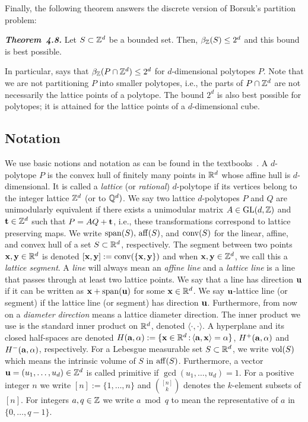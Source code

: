 Finally, the following theorem answers the discrete version of Borsuk's partition problem:

\begin{manualthm}\textbf{\emph{Theorem~4.8.}}
    Let $S \subset \mathbb{Z}^d$ be a bounded set. Then, $\beta_{\mathbb{Z}}(S) \leq 2^d$ and this bound is best possible.
\end{manualthm}

In particular,  says that $\beta_{\mathbb{Z}}(P \cap \mathbb{Z}^d) \leq 2^d$ for $d$-dimensional polytopes $P$. Note that we are not partitioning $P$ into smaller polytopes, i.e., the parts of $P \cap \mathbb{Z}^d$ are not necessarily the lattice points of a polytope. The bound $2^d$ is also best possible for polytopes; it is attained for the lattice points of a $d$-dimensional cube.

\subsection*{Notation}
We use basic notions and notation as can be found in the textbooks~\cite{grub07,zieglerbook}.
A $d$-polytope $P$ is the convex hull of finitely many points in $\mathbb{R}^d$ whose affine hull is $d$-dimensional. It is called a \emph{lattice} (or \emph{rational}) $d$-polytope if its vertices belong to the integer lattice $\mathbb{Z}^d$ (or to $\mathbb{Q}^d)$. We say two lattice $d$-polytopes $P$ and $Q$ are unimodularly equivalent if there exists a unimodular matrix $A \in \operatorname{GL}(d,\mathbb{Z})$ and $\mathbf{t} \in \mathbb{Z}^d$ such that $P=AQ+\mathbf{t}$, i.e., these transformations correspond to lattice preserving maps. We write $\operatorname{span}(S), \, \operatorname{aff}(S)$, and $\operatorname{conv}(S)$ for the linear, affine, and convex hull of a set $S \subset \mathbb{R}^d$, respectively.
The segment between two points $\mathbf{x},\mathbf{y} \in \mathbb{R}^d$ is denoted $[\mathbf{x},\mathbf{y}]:=\operatorname{conv}(\{\mathbf{x},\mathbf{y}\})$ and when $\mathbf{x},\mathbf{y} \in \mathbb{Z}^d$, we call this a \textit{lattice segment}. A \emph{line} will always mean an \emph{affine line} and a \emph{lattice line} is a line that passes through at least two lattice points. We say that a line has direction $\mathbf{u}$ if it can be written as $\mathbf{x}+\operatorname{span}(\mathbf{u})$ for some $\mathbf{x} \in \mathbb{R}^d$. We say $\mathbf{u}$-lattice line (or segment) if the lattice line (or segment) has direction $\mathbf{u}$. Furthermore, from now on a \textit{diameter direction} means a lattice diameter direction. The inner product we use is the standard inner product on $\mathbb{R}^d$, denoted $\langle \cdot, \cdot \rangle$. A hyperplane and its closed half-spaces are denoted $H(\mathbf{a},\alpha):= \{ \mathbf{x} \in \mathbb{R}^d \, \mathrm{:}\, \langle \mathbf{a}, \mathbf{x} \rangle = \alpha \}$, $H^+(\mathbf{a},\alpha)$ and $H^{-}(\mathbf{a},\alpha)$, respectively. For a Lebesgue measurable set $S\subset \mathbb{R}^d$, we write $\operatorname{vol}(S)$ which means the intrinsic volume of $S$ in $\operatorname{aff}(S)$. Furthermore, a vector $\mathbf{u}=(u_1, \ldots, u_d) \in \mathbb{Z}^d$ is called primitive if $\gcd(u_1, \ldots, u_d) =1$. For a positive integer $n$ we write $[n]:=\{1, \ldots, n\}$ and $\binom{[n]}{k}$ denotes the $k$-element subsets of $[n]$. For integers $a,q \in \mathbb{Z}$ we write $a \bmod q$ to mean the representative of $a$ in $\{0, \ldots, q-1\}$.
